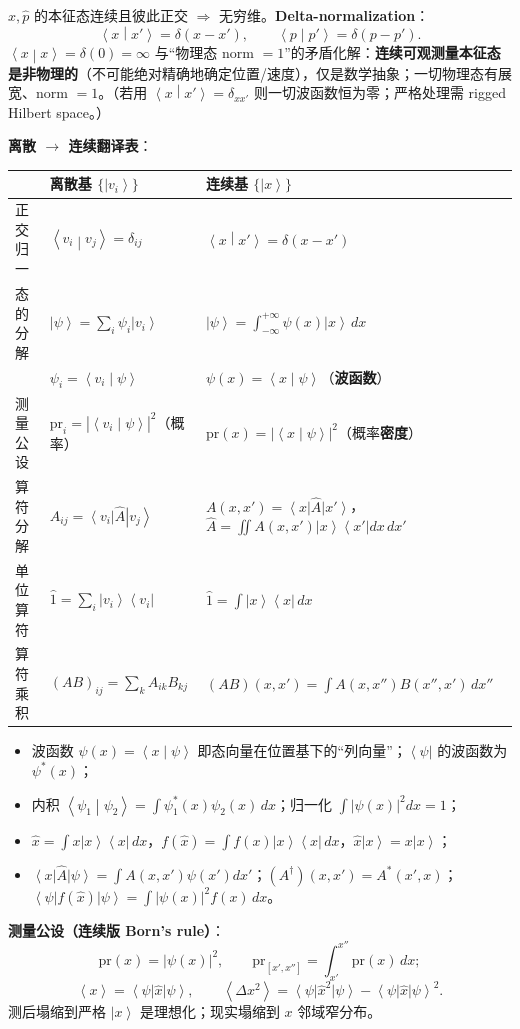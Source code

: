 \documentclass[11pt]{ctexart}
\newcommand{\ket}[1]{\left|#1\right\rangle}
\newcommand{\bra}[1]{\left\langle#1\right|}
\newcommand{\braket}[2]{\left\langle#1\middle|#2\right\rangle}
\newcommand{\ev}[1]{\left\langle#1\right\rangle}
\newcommand{\op}[1]{\hat{#1}}
\begin{document}
$\op x,\op p$ 的本征态连续且彼此正交 $\Rightarrow$ 无穷维。\textbf{Delta-normalization}：
\[
\braket x{x'}=\delta(x-x'),\qquad \braket p{p'}=\delta(p-p').
\]
$\braket xx=\delta(0)=\infty$ 与``物理态 norm $=1$''的矛盾化解：\textbf{连续可观测量本征态是非物理的}（不可能绝对精确地确定位置/速度），仅是数学抽象；一切物理态有展宽、norm $=1$。（若用 $\braket x{x'}=\delta_{xx'}$ 则一切波函数恒为零；严格处理需 rigged Hilbert space。）

\textbf{离散 $\to$ 连续翻译表}：
\begin{center}
\begin{tabular}{lll}
\toprule
 & 离散基 $\{\ket{v_i}\}$ & 连续基 $\{\ket x\}$\\
\midrule
正交归一 & $\braket{v_i}{v_j}=\delta_{ij}$ & $\braket x{x'}=\delta(x-x')$\\
态的分解 & $\ket\psi=\sum_i\psi_i\ket{v_i}$ & $\ket\psi=\int_{-\infty}^{+\infty}\psi(x)\ket x\,dx$\\
 & $\psi_i=\braket{v_i}\psi$ & $\psi(x)=\braket x\psi$（\textbf{波函数}）\\
测量公设 & $\mathrm{pr}_i=|\braket{v_i}\psi|^2$（概率） & $\mathrm{pr}(x)=|\braket x\psi|^2$（概率\textbf{密度}）\\
算符分解 & $A_{ij}=\bra{v_i}\op A\ket{v_j}$ & $A(x,x')=\bra x\op A\ket{x'}$，$\op A=\iint A(x,x')\ket x\bra{x'}dx\,dx'$\\
单位算符 & $\op1=\sum_i\ket{v_i}\bra{v_i}$ & $\op1=\int\ket x\bra x\,dx$\\
算符乘积 & $(AB)_{ij}=\sum_kA_{ik}B_{kj}$ & $(AB)(x,x')=\int A(x,x'')B(x'',x')\,dx''$\\
\bottomrule
\end{tabular}
\end{center}

\begin{itemize}
\item 波函数 $\psi(x)=\braket x\psi$ 即态向量在位置基下的``列向量''；$\bra\psi$ 的波函数为 $\psi^*(x)$；
\item 内积 $\braket{\psi_1}{\psi_2}=\int\psi_1^*(x)\psi_2(x)\,dx$；归一化 $\int|\psi(x)|^2dx=1$；
\item $\op x=\int x\ket x\bra x\,dx$，$f(\op x)=\int f(x)\ket x\bra x\,dx$，$\op x\ket x=x\ket x$；
\item $\bra x\op A\ket\psi=\int A(x,x')\psi(x')dx'$；$(A^\dagger)(x,x')=A^*(x',x)$；$\bra\psi f(\op x)\ket\psi=\int|\psi(x)|^2f(x)\,dx$。
\end{itemize}

\textbf{测量公设（连续版 Born's rule）}：
\[
\mathrm{pr}(x)=|\psi(x)|^2,\qquad \mathrm{pr}_{[x',x'']}=\int_{x'}^{x''}\mathrm{pr}(x)\,dx;
\]
\[
\ev x=\bra\psi\op x\ket\psi,\qquad \ev{\Delta x^2}=\bra\psi\op x^2\ket\psi-\bra\psi\op x\ket\psi^2.
\]
测后塌缩到严格 $\ket x$ 是理想化；现实塌缩到 $x$ 邻域窄分布。
\end{document}
